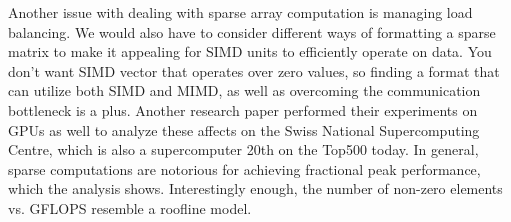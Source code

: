 \documentclass[11pt]{article}
\begin{document}
Another issue with dealing with sparse array computation is managing load balancing. \cite{10.1145/3149704.3149767} We would also have to consider different ways of formatting a sparse matrix to make it appealing for SIMD units to efficiently operate on data. You don't want SIMD vector that operates over zero values, so finding a format that can utilize both SIMD and MIMD, as well as overcoming the communication bottleneck is a plus. Another research paper performed their experiments on GPUs as well to analyze these affects on the Swiss National Supercomputing Centre, which is also a supercomputer 20th on the Top500 today. In general, sparse computations are notorious for achieving fractional peak performance, which the analysis shows. Interestingly enough, the number of non-zero elements vs. GFLOPS resemble a roofline model.


 
\end{document}

